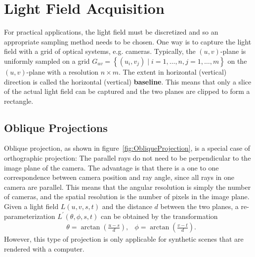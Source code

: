 \section{Light Field Acquisition}

For practical applications, the light field must be discretized and so an appropriate sampling method needs to be chosen.
One way is to capture the light field with a grid of optical systems, e.g. cameras.
Typically, the $(u, v)$-plane is uniformly sampled on a grid $G_{uv} = \left \{ \left( u_i, v_j \right) \mid i = 1,\dots, n, j = 1, \dots, m\right \}$ on the $(u, v)$-plane with a resolution $n \times m$.
The extent in horizontal (vertical) direction is called the horizontal (vertical) \textbf{baseline}.
This means that only a slice of the actual light field can be captured and the two planes are clipped to form a rectangle.



\subsection*{Oblique Projections}

Oblique projection, as shown in figure~\ref{fig:ObliqueProjection}, is a special case of orthographic projection: The parallel rays do not need to be perpendicular to the image plane of the camera.
The advantage is that there is a one to one correspondence between camera position and ray angle, since all rays in one camera are parallel.
This means that the angular resolution is simply the number of cameras, and the spatial resolution is the number of pixels in the image plane.
Given a light field $L(u, v, s, t)$ and the distance $d$ between the two planes, a re-parameterization $L^{\prime}(\theta, \phi, s, t)$ can be obtained by the transformation
\begin{align*}
		& \theta = \arctan\left(\frac{u - s}{d}\right), & \phi = \arctan\left(\frac{v - t}{d}\right).
\end{align*}
However, this type of projection is only applicable for synthetic scenes that are rendered with a computer.


